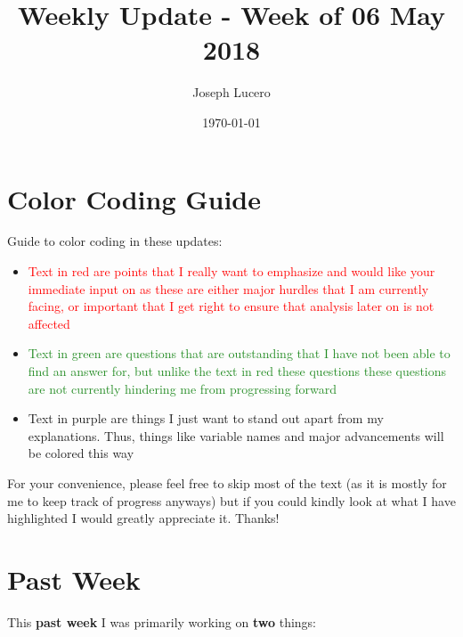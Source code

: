 \documentclass[12pt]{article}
\title{Weekly Update - Week of 06 May 2018}
\author{Joseph Lucero}
\date{\today}
\begin{document}
\maketitle

\section*{Color Coding Guide}

Guide to color coding in these updates:
\begin{itemize}
	\item \textcolor{Red}{Text in red are points that I really want to emphasize and would like your immediate input on as these are either major hurdles that I am currently facing, or important that I get right to ensure that analysis later on is not affected}
	\item \textcolor{ForestGreen}{Text in green are questions that are outstanding that I have not been able to find an answer for, but unlike the text in red these questions these questions are not currently hindering me from progressing forward}
	\item \textcolor{RoyalPurple}{Text in purple are things I just want to stand out apart from my explanations. Thus, things like variable names and major advancements will be colored this way}
\end{itemize}
For your convenience, please feel free to skip most of the text (as it is mostly for me to keep track of progress anyways) but if you could kindly look at what I have highlighted I would greatly appreciate it. Thanks!

\section{Past Week}

This \textbf{past week} I was primarily working on \textbf{two} things:
\end{document}
